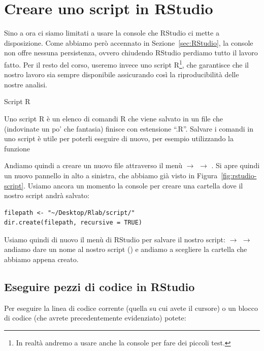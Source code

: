 \section{Creare uno script in RStudio}
\label{sec:Rscript}

Sino a ora ci siamo limitati a usare la console che RStudio ci mette a disposizione. Come abbiamo per\`o accennato in Sezione~\ref{sec:RStudio}, la console non offre nessuna persistenza, ovvero chiudendo RStudio perdiamo tutto il lavoro fatto. Per il resto del corso, useremo invece uno script R\footnote{In realt\`a andremo a usare anche la console per fare dei piccoli test.}, che garantisce che il nostro lavoro sia sempre disponibile assicurando cos\`i la riproducibilit\`a delle nostre analisi.


\begin{mybox}{Script R}	
	
Uno script R \`e un elenco di comandi R che viene salvato in un file che (indovinate un po' che fantasia) finisce con estensione ``.R''. Salvare i comandi in uno script \`e utile per poterli eseguire di nuovo, per esempio utilizzando la funzione 

\end{mybox}


\noindent Andiamo quindi a creare un nuovo file attraverso il men\`u  $\rightarrow$   $\rightarrow$ . Si apre quindi un nuovo pannello in alto a sinistra, che abbiamo gi\`a visto in Figura~\ref{fig:rstudio-script}. 
%
Usiamo ancora un momento la console per creare una cartella dove il nostro script andr\`a salvato:

\begin{lstlisting}[style=Rstyle]
filepath <- "~/Desktop/Rlab/script/"
dir.create(filepath, recursive = TRUE)
\end{lstlisting}
%
Usiamo quindi di nuovo il men\`u di RStudio per salvare il nostro script:  $\rightarrow$   $\rightarrow$ andiamo dare un nome al nostro  script () e andiamo a scegliere la cartella che abbiamo appena creato.


\subsection{Eseguire pezzi di codice in RStudio}	

Per eseguire la linea di codice corrente (quella su cui avete il cursore) o un blocco di codice (che avrete precedentemente evidenziato) potete:

